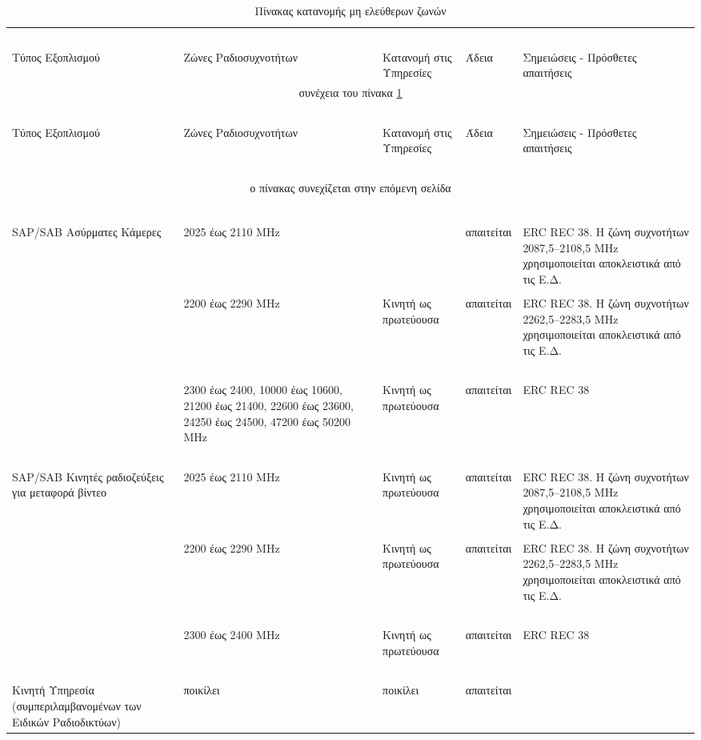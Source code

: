 \documentclass[a4paper, 12pt, twoside]{report}
\begin{document}
{{{{{{\begin{landscape}
			\begin{longtable} { m{3cm} m{4cm} m{4cm} m{3cm} m{5cm} }
					\caption[Πίνακας κατανομής μη ελεύθερων ζωνών \cite{ΦΕΚ2006Β399, ΦΕΚ2011Β2512}]{Πίνακας κατανομής μη ελεύθερων ζωνών}
					\label{πιν.:Πίνακας κατανομής μη ελεύθερων ζωνών}\\
					\hline
					~\\
					Τύπος Εξοπλισμού & Ζώνες Ραδιοσυχνοτήτων & Κατανομή στις Υπηρεσίες & Άδεια & Σημειώσεις - Πρόσθετες απαιτήσεις\\
					\hline
					\endfirsthead
					\multicolumn{5}{c}{συνέχεια του πίνακα \ref{πιν.:Πίνακας κατανομής μη ελεύθερων ζωνών}}\\
					\hline
					~\\
					Τύπος Εξοπλισμού & Ζώνες Ραδιοσυχνοτήτων & Κατανομή στις Υπηρεσίες & Άδεια & Σημειώσεις - Πρόσθετες απαιτήσεις\\
					\hline
					~\\
					\endhead
					\hline
					\multicolumn{5}{c}{ο πίνακας συνεχίζεται στην επόμενη σελίδα}\\
					\endfoot
					\multicolumn{5}{c}{ολοκληρώθηκε ο πίνακας \ref{πιν.:Πίνακας κατανομής μη ελεύθερων ζωνών}}\\
					\endlastfoot
					~\\
					\multirow{3}{*}{\parbox{3cm}{SAP/SAB Ασύρματες Κάμερες}} & 2025 έως 2110 MHz & & απαιτείται & ERC REC 38. Η ζώνη συχνοτήτων 2087,5–2108,5 MHz χρησιμοποιείται αποκλειστικά από τις Ε.Δ.\\
					\cline{2-5}
					~\\
					& 2200 έως 2290 MHz & Κινητή ως πρωτεύουσα & απαιτείται & ERC REC 38. Η ζώνη συχνοτήτων 2262,5–2283,5 MHz χρησιμοποιείται αποκλειστικά από τις Ε.Δ.\\
					\cline{2-5}
					~\\
					& 2300 έως 2400, 10000 έως 10600, 21200 έως 21400, 22600 έως 23600, 24250 έως 24500, 47200 έως 50200 MHz & Κινητή ως πρωτεύουσα & απαιτείται & ERC REC 38\\
					\hdashline
					~\\
					\multirow{3}{*}{\parbox{3cm}{SAP/SAB Κινητές ραδιοζεύξεις για μεταφορά βίντεο}} & 2025 έως 2110 MHz & Κινητή ως πρωτεύουσα & απαιτείται & ERC REC 38. Η ζώνη συχνοτήτων 2087,5–2108,5 MHz χρησιμοποιείται αποκλειστικά από τις Ε.Δ.\\
					\cline{2-5}
					~\\
					& 2200 έως 2290 MHz & Κινητή ως πρωτεύουσα & απαιτείται & ERC REC 38. Η ζώνη συχνοτήτων 2262,5–2283,5 MHz χρησιμοποιείται αποκλειστικά από τις Ε.Δ.\\
					\cline{2-5}
					~\\
					& 2300 έως 2400 MHz & Κινητή ως πρωτεύουσα & απαιτείται & ERC REC 38\\
					\hdashline
					~\\
					Κινητή Υπηρεσία (συμπεριλαμβανομένων των Ειδικών Ραδιοδικτύων) & ποικίλει & ποικίλει & απαιτείται & \\
					\hline
			\end{longtable}
			\end{landscape}
				
}}}}}}
\end{document}
